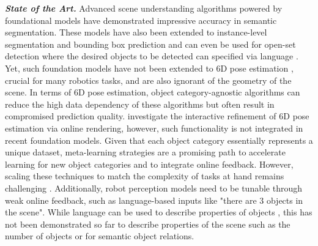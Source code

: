 \documentclass{erc-B2}
\begin{document}
\textit{\textbf{State of the Art.}}
Advanced scene understanding algorithms powered by foundational models \cite{SAM,DINOv2} have demonstrated impressive accuracy in semantic segmentation. These models have also been extended to instance-level segmentation and bounding box prediction \cite{liu2023grounding,SAM} and can even be used for open-set detection where the desired objects to be detected can specified via language \cite{liu2023grounding}. Yet, such foundation models have not been extended to 6D pose estimation \cite{FFB6D, pvn3d, DuffhaussRAL}, crucial for many robotics tasks, and are also ignorant of the geometry of the scene. In terms of 6D pose estimation, object category-agnostic algorithms \cite{liu2022gen6d,gao2023sad} can reduce the high data dependency \cite{FFB6D, pvn3d, DuffhaussRAL} of these algorithms but often result in compromised prediction quality. %
\cite{Inerf,RePOSE,chen2020category} investigate the interactive refinement of 6D pose estimation via online rendering, however, such functionality is not integrated in recent foundation models. %
Given that each object category essentially represents a unique dataset, meta-learning strategies \cite{finn2017model,Gao_2022_CVPR,volpp2021bayesian} are a promising path to accelerate learning for new object categories and to integrate online feedback. However, scaling these techniques to match the complexity of tasks at hand remains challenging \cite{Gao_2022_CVPR}. %
Additionally, robot perception models need to be tunable through weak online feedback, such as language-based inputs like "there are 3 objects in the scene". While language can be used to describe properties of objects \cite{liu2023grounding}, this has not been demonstrated so far to describe properties of the scene such as the number of objects or for semantic object relations. 

\end{document}
